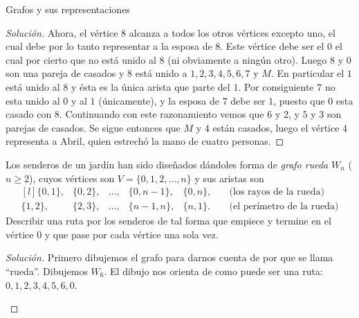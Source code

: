 \begin{section}{Grafos y sus representaciones}
\begin{proof}[Solución]
Ahora, el vértice $8$ alcanza a todos los otros vértices excepto uno, el cual debe por lo tanto representar a la esposa de $8$. Este vértice debe ser el $0$ el cual por cierto que no está unido al $8$ (ni ob\-via\-men\-te a ningún otro). Luego $8$ y $0$ son una pareja de casados y $8$ está unido a $1, 2, 3, 4, 5, 6, 7$ y $M$. En particular el $1$ está unido al $8$ y ésta es la única arista que parte del $1$. Por consiguiente $7$ no esta unido al $0$ y al $1$ (únicamente), y la esposa de $7$ debe ser $1$, puesto que $0$ esta casado con $8$. Continuando con este razonamiento vemos que $6$ y $2$, y $5$ y $3$ son parejas de casados. Se sigue entonces que $M$ y $4$ están casados, luego el vértice $4$ representa a Abril, quien estrechó la mano de cuatro personas.
\end{proof}

\begin{ejemplo}\label{ejemplo-grafo-rueda}
Los senderos de un jardín han sido diseñados dándoles forma de \textit{grafo rueda} $W_n$ ($n \ge 2$), cuyos vértices son $V=\{0,1,2,\ldots,n\}$ y sus aristas son
$$
\begin{matrix*}[l]
\{0,1\}, &\{0,2\},&\ldots,&\{0,n-1\}, &\{0,n\},&\quad\text{(los rayos de la rueda)}\\
\{1,2\}, &\{2,3\},&\ldots,&\{n-1,n\},&\{n,1\}.&\quad\text{(el perímetro de la rueda)}
\end{matrix*}
$$
Describir una ruta por los senderos de tal forma que empiece y termine en el vértice $0$ y que pase por cada vértice una sola vez.
\end{ejemplo}
\begin{proof}[Solución]
        Primero  dibujemos el grafo para darnos cuenta de por que se llama ``rueda''. Dibujemos $W_6$. El dibujo nos orienta de como puede ser una ruta: $0,1,2,3,4,5,6,0$. 
        \begin{figure}[h]
            \begin{center}
        \end{center}
        \end{figure}
        


\end{proof}
\end{section}
